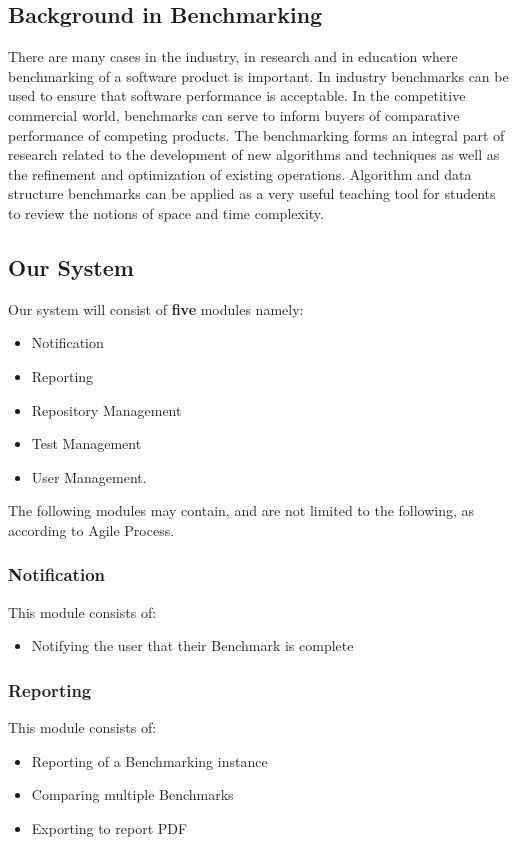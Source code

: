 \subsection{Background in Benchmarking}
There are many cases in the industry, in research and in education where benchmarking of
a software product is important. In industry benchmarks can be used to ensure that software
performance is acceptable. In the competitive commercial world, benchmarks can serve to inform
buyers of comparative performance of competing products. The benchmarking forms an integral
part of research related to the development of new algorithms and techniques as well as the refinement
and optimization of existing operations. Algorithm and data structure benchmarks can be applied
as a very useful teaching tool for students to review the notions of space and time complexity.

\subsection{Our System}
Our system will consist of \textbf{five} modules namely:
\begin{itemize}
	\item Notification 
	\item Reporting
	\item Repository Management
	\item Test Management
	\item User Management.
\end{itemize}
The following modules may contain, and are not limited to the following, as according to Agile Process.


\subsubsection{Notification}
This module consists of:
\begin{itemize}
	\item Notifying the user that their Benchmark is complete
\end{itemize}

\subsubsection{Reporting}
This module consists of:
\begin{itemize}
	\item Reporting of a Benchmarking instance
	\item Comparing multiple Benchmarks
	\item Exporting to report PDF
\end{itemize}

